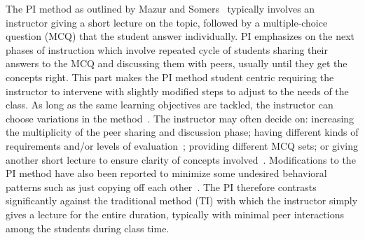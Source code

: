 \documentclass[twocolumn,secnumarabic,amssymb, nobibnotes, aps, prd]{revtex4-2}
\begin{document}

    
    The PI method as outlined by Mazur and Somers~\cite{mazur1997peer} typically involves an instructor giving a short lecture on the topic, followed by a multiple-choice question (MCQ) that the student answer individually.
    PI emphasizes on the next phases of instruction which involve repeated cycle of students sharing their answers to the MCQ and discussing them with peers, usually until they get the concepts right.
    This part makes the PI method student centric requiring the instructor to intervene with slightly modified steps to adjust to the needs of the class.
    As long as the same learning objectives are tackled, the instructor can choose variations in the method~\cite{smith2009peer}.
    The instructor may often decide on: increasing the multiplicity of the peer sharing and discussion phase; having different kinds of requirements and/or levels of evaluation~\cite{crouch2001peer}; providing different MCQ sets; or giving another short lecture to ensure clarity of concepts involved~\cite{lasry2008peer}.
    Modifications to the PI method have also been reported to minimize some undesired behavioral patterns such as just copying off each other~\cite{smith2009peer}.
    The PI therefore contrasts significantly against the traditional method (TI) with which the instructor simply gives a lecture for the entire duration, typically with minimal peer interactions among the students during class time.
    
\end{document}
